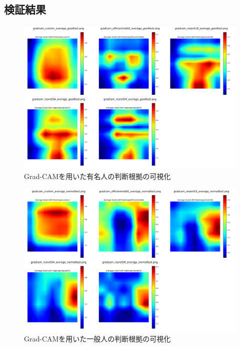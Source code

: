 \documentclass[a4paper,11pt,titlepage]{jsarticle}
\begin{document}
\subsection{検証結果}
\begin{figure}[H]
    \centering
    \includegraphics[width=1.1\textwidth]{combined_images_good.png}
    \caption{Grad-CAMを用いた有名人の判断根拠の可視化}
    \label{fig:gradcam_good}
\end{figure}
\begin{figure}[H]
    \centering
    \includegraphics[width=1.1\textwidth]{combined_images_normal.png}
    \caption{Grad-CAMを用いた一般人の判断根拠の可視化}
    \label{fig:gradcam_normal}
\end{figure}
\end{document}
